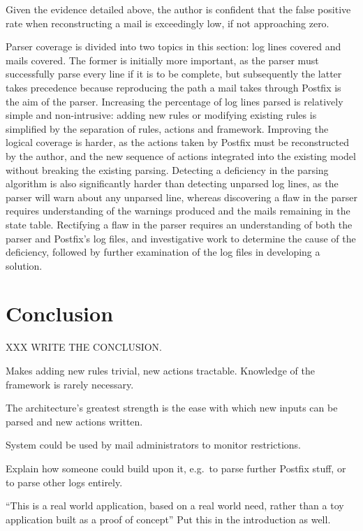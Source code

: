 \documentclass[draft]{svmult}
\begin{document}
Given the evidence detailed above, the author is confident that the false
positive rate when reconstructing a mail is exceedingly low, if not
approaching zero.

Parser coverage is divided into two topics in this section: log lines
covered and mails covered.  The former is initially more important, as the
parser must successfully parse every line if it is to be complete, but
subsequently the latter takes precedence because reproducing the path a
mail takes through Postfix is the aim of the parser.  Increasing the
percentage of log lines parsed is relatively simple and non-intrusive:
adding new rules or modifying existing rules is simplified by the
separation of rules, actions and framework.  Improving the logical coverage
is harder, as the actions taken by Postfix must be reconstructed by the
author, and the new sequence of actions integrated into the existing model
without breaking the existing parsing.  Detecting a deficiency in the
parsing algorithm is also significantly harder than detecting unparsed log
lines, as the parser will warn about any unparsed line, whereas discovering
a flaw in the parser requires understanding of the warnings produced and
the mails remaining in the state table.  Rectifying a flaw in the parser
requires an understanding of both the parser and Postfix's log files, and
investigative work to determine the cause of the deficiency, followed by
further examination of the log files in developing a solution.

\section{Conclusion}

XXX WRITE THE CONCLUSION\@.

Makes adding new rules trivial, new actions tractable.  Knowledge of the
framework is rarely necessary.

The architecture's greatest strength is the ease with which new inputs can
be parsed and new actions written.

System could be used by mail administrators to monitor restrictions.

Explain how someone could build upon it, e.g.\ to parse further Postfix
stuff, or to parse other logs entirely.

``This is a real world application, based on a real world need, rather than
a toy application built as a proof of concept''  Put this in the
introduction as well.



\label{bibliography}
\end{document}
